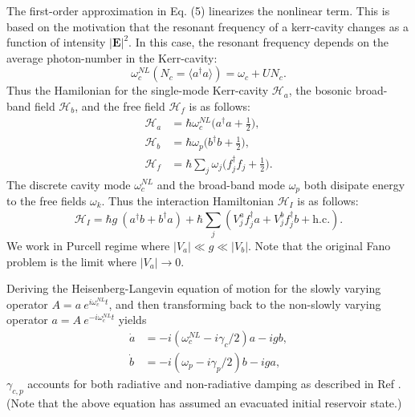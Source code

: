 \documentclass[12pt]{article}
\begin{document}
The first-order approximation in Eq. (5) linearizes the nonlinear term.
This is based on the motivation that the resonant frequency of a kerr-cavity
changes as a function of intensity $|\mathbf{E}|^2$. In this case, the resonant
frequency depends on the average photon-number in the Kerr-cavity:
\begin{equation}
\omega_c^{NL}( N_c = \langle a^{\dagger}a \rangle )  = \omega_c + UN_c.
\end{equation}
Thus the Hamilonian for the single-mode Kerr-cavity $\mathcal{H}_a$, the 
bosonic broad-band field $\mathcal{H}_b$, and the free field $\mathcal{H}_f$
is as follows:
\begin{align}
\mathcal{H}_a &= \hbar\omega_c^{NL}
    \Big( a^{\dagger}a + \frac{1}{2} \Big),
\\
\mathcal{H}_b &= \hbar\omega_p
    \Big( b^{\dagger}b + \frac{1}{2} \Big),
\\
\mathcal{H}_f &= \hbar \sum_j \omega_j
    \Big( f^{\dagger}_j f_j + \frac{1}{2} \Big).
\end{align}
The discrete cavity mode $\omega_c^{NL}$ and the broad-band mode $\omega_p$
both disipate energy to the free fields $\omega_k$. Thus the interaction
Hamiltonian $\mathcal{H}_{I}$ is as follows:
\begin{equation}
\mathcal{H}_I = \hbar g \: (
    a^{\dagger}b + b^{\dagger}a )
    + \hbar \sum_j ( V_j^a f^{\dagger}_j a 
        + V_j^b f^{\dagger}_j b + \mathrm{h.c.} ).
\end{equation}
We work in Purcell regime where $|V_a| \ll g \ll |V_b|$. Note that the
original Fano problem is the limit where $|V_a| \rightarrow 0$.

Deriving the Heisenberg-Langevin equation of motion for the slowly varying
operator $A = a \: e^{i\omega_c^{NL} t}$, and then 
transforming back to the non-slowly varying operator $ a = 
A \: e^{-i\omega_c^{NL} t}$ yields
\begin{align}
\dot{ a } &= -i ( \omega_c^{NL} - i\gamma_c/2 ) a 
    - ig b,
\\
\dot{b} &= -i ( \omega_p - i\gamma_p/2 ) b
    - ig a,
\end{align}
$\gamma_{c,p}$ accounts for both radiative and non-radiative damping as
described in Ref \cite{thakkar2015quantum}. (Note that the above equation
has assumed an evacuated initial reservoir state.)
\end{document}

